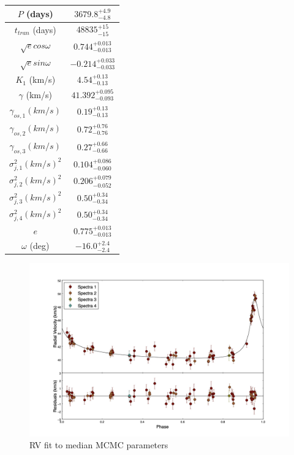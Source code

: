 \documentclass{article}
\begin{document}
\begin{table}
\centering
\begin{tabular}{| c | c |}
\hline
$P$ (days) & $3679.8^{+4.9}_{-4.8}$ \\
\hline
$t_{tran}$ (days) & $48835^{+15}_{-15}$ \\
\hline
$\sqrt{e} cos\omega$ & $0.744^{+0.013}_{-0.013}$ \\
\hline
$\sqrt{e} sin\omega$ & $-0.214^{+0.033}_{-0.033}$ \\
\hline
$K_1$ (km/s) & $4.54^{+0.13}_{-0.13}$ \\
\hline
$\gamma$ (km/s) & $41.392^{+0.095}_{-0.093}$ \\
\hline
$\gamma_{os,1} (km/s)$ & $0.19^{+0.13}_{-0.13}$ \\
\hline
$\gamma_{os,2} (km/s)$ & $0.72^{+0.76}_{-0.76}$ \\
\hline
$\gamma_{os,3} (km/s)$ & $0.27^{+0.66}_{-0.66}$ \\
\hline
$\sigma^2_{j,1} (km/s)^2$ & $0.104^{+0.086}_{-0.060}$ \\
\hline
$\sigma^2_{j,2} (km/s)^2$ & $0.206^{+0.079}_{-0.052}$ \\
\hline
$\sigma^2_{j,3} (km/s)^2$ & $0.50^{+0.34}_{-0.34}$ \\
\hline
$\sigma^2_{j,4} (km/s)^2$ & $0.50^{+0.34}_{-0.34}$ \\
\hline
$e$ & $0.775^{+0.013}_{-0.013}$ \\
\hline
$\omega$ (deg) & $-16.0^{+2.4}_{-2.4}$ \\
\hline
\end{tabular}
\end{table}

\begin{figure}[!htb]
\centering
\includegraphics[width=\textwidth]{RVfit_100000.jpg}
\caption{RV fit to median MCMC parameters}
\end{figure}
\end{document}
